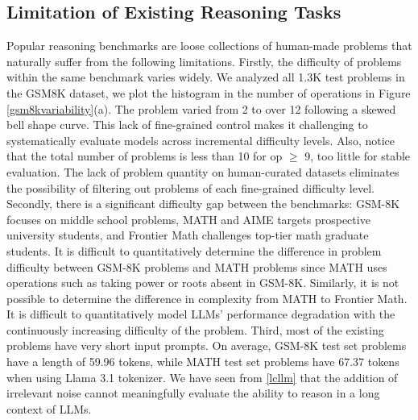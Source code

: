 \subsection{Limitation of Existing Reasoning Tasks} 
\label{reasoninglimitations} 
Popular reasoning benchmarks are loose collections of human-made problems that naturally suffer from the following limitations. 
Firstly, the difficulty of problems within the same benchmark varies widely. 
We analyzed all 1.3K test problems in the GSM8K dataset, we plot the histogram in the number of operations in Figure \ref{gsm8kvariability}(a). The problem varied from 2 to over 12 following a skewed bell shape curve. 
This lack of fine-grained control makes it challenging to systematically evaluate models across incremental difficulty levels. 
Also, notice that the total number of problems is less than 10 for op $\geq$ 9, too little for stable evaluation. The lack of problem quantity on human-curated datasets eliminates the possibility of filtering out problems of each fine-grained difficulty level. 
Secondly, there is a significant difficulty gap between the benchmarks: GSM-8K focuses on middle school problems, MATH \citep{hendrycks2021measuringmathematicalproblemsolving} and AIME targets prospective university students, and Frontier Math challenges top-tier math graduate students. 
It is difficult to quantitatively determine the difference in problem difficulty between GSM-8K problems and MATH problems since MATH uses operations such as taking power or roots absent in GSM-8K. 
Similarly, it is not possible to determine the difference in complexity from MATH to Frontier Math. 
It is difficult to quantitatively model LLMs' performance degradation with the continuously increasing difficulty of the problem. 
Third, most of the existing problems have very short input prompts. On average, GSM-8K test set problems have a length of 59.96 tokens, while MATH test set problems have 67.37 tokens when using Llama 3.1 tokenizer. We have seen from \ref{lcllm} that the addition of irrelevant noise cannot meaningfully evaluate the ability to reason in a long context of LLMs. 
